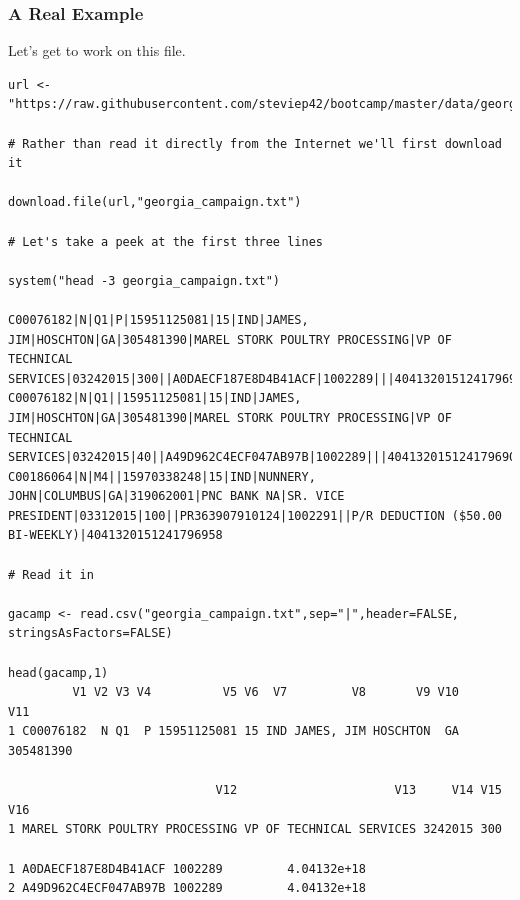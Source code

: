 \documentclass{beamer}
\begin{document}
% 

\begin{frame}[fragile]
\frametitle{A Real Example}Let's get to work on this file.
\tiny
\begin{verbatim}
url <- "https://raw.githubusercontent.com/steviep42/bootcamp/master/data/georgia_campaign.txt"

# Rather than read it directly from the Internet we'll first download it

download.file(url,"georgia_campaign.txt")

# Let's take a peek at the first three lines

system("head -3 georgia_campaign.txt")

C00076182|N|Q1|P|15951125081|15|IND|JAMES, JIM|HOSCHTON|GA|305481390|MAREL STORK POULTRY PROCESSING|VP OF TECHNICAL SERVICES|03242015|300||A0DAECF187E8D4B41ACF|1002289|||4041320151241796907
C00076182|N|Q1||15951125081|15|IND|JAMES, JIM|HOSCHTON|GA|305481390|MAREL STORK POULTRY PROCESSING|VP OF TECHNICAL SERVICES|03242015|40||A49D962C4ECF047AB97B|1002289|||4041320151241796908
C00186064|N|M4||15970338248|15|IND|NUNNERY, JOHN|COLUMBUS|GA|319062001|PNC BANK NA|SR. VICE PRESIDENT|03312015|100||PR363907910124|1002291||P/R DEDUCTION ($50.00 BI-WEEKLY)|4041320151241796958

# Read it in

gacamp <- read.csv("georgia_campaign.txt",sep="|",header=FALSE, stringsAsFactors=FALSE)

head(gacamp,1)
         V1 V2 V3 V4          V5 V6  V7         V8       V9 V10       V11
1 C00076182  N Q1  P 15951125081 15 IND JAMES, JIM HOSCHTON  GA 305481390

                             V12                      V13     V14 V15 V16
1 MAREL STORK POULTRY PROCESSING VP OF TECHNICAL SERVICES 3242015 300    

1 A0DAECF187E8D4B41ACF 1002289         4.04132e+18
2 A49D962C4ECF047AB97B 1002289         4.04132e+18

\end{verbatim}
\end{frame}

%
\end{document}
